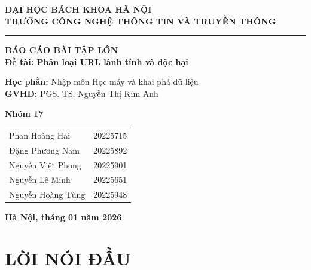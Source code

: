 \documentclass[a4paper,12pt]{report}
\begin{document}
\begin{titlepage}
    \begin{center}
        \textbf{\large ĐẠI HỌC BÁCH KHOA HÀ NỘI}\\
        \textbf{\large TRƯỜNG CÔNG NGHỆ THÔNG TIN VÀ TRUYỀN THÔNG} \\
        \rule{10cm}{0.4pt}
        
        \vspace{3cm}
        
        \textbf{\Huge BÁO CÁO BÀI TẬP LỚN} \\[1cm]
        \textbf{\Large Đề tài: Phân loại URL lành tính và độc hại}
        
        \vspace{1.5cm}
        
        \textbf{Học phần:} Nhập môn Học máy và khai phá dữ liệu \\
        \textbf{GVHD:} PGS. TS. Nguyễn Thị Kim Anh
        
        \vspace{2cm}
        
        \textbf{\Large Nhóm 17} \\[0.5cm]
        \begin{tabular}{ll}
            Phan Hoàng Hải & 20225715 \\
            Đặng Phương Nam & 20225892 \\
            Nguyễn Việt Phong & 20225901 \\
            Nguyễn Lê Minh & 20225651 \\
            Nguyễn Hoàng Tùng & 20225948 \\
        \end{tabular}
        
        \vfill
        
        \textbf{Hà Nội, tháng 01 năm 2026}
    \end{center}
\end{titlepage}

\tableofcontents
\newpage

\chapter*{LỜI NÓI ĐẦU}
\end{document}
